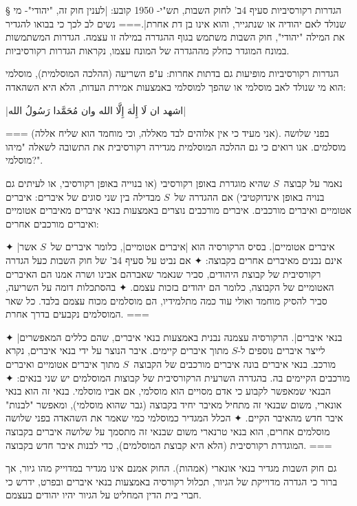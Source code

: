 § הגדרות רקורסיביות
סעיף 4ב' לחוק השבות, תש"י- 1950 קובע:
\ע|לענין חוק זה, "יהודי"- מי שנולד לאם יהודיה או שנתגייר, והוא אינו בן
דת אחרת|.===
נשים לב לכך כי בבואו להגדיר את המילה "יהודי", חוק השבות משתמש בגוף ההגדרה במילה
זו עצמה. הגדרות המשתמשות במונח המוגדר כחלק מההגדרה של המונח עצמו, נקראות הגדרות
רקורסיביות.

הגדרות רקורסיביות מופיעות גם בדתות אחרות: ע"פ השריעה (ההלכה המוסלמית), מוסלמי
הוא מי שנולד לאב מוסלמי או שהפך למוסלמי באמצעות אמירת העדות, הלא היא השהאדה:
\begin{Arabic}
  \ע|اشهد ان لَا إِلٰهَ إِلَّا الله وان مُحَمَّدا رَسُولُ الله|
\end{Arabic}
===
(אני מעיד כי אין אלוהים לבד מאללה, וכי מוחמד הוא שליח אללה). בפני שלושה
מוסלמים. אנו רואים כי גם ההלכה המוסלמית מגדירה רקורסיבית את התשובה לשאלה "מיהו
מוסלמי?".

נאמר על קבוצה~$S$ שהיא מוגדרת באופן רקורסיבי (או בנוייה באופן רקורסיבי, או
לעיתים גם בנויה באופן אינדוקטיבי) אם ההגדרה של~$S$ מבדילה בין שני סוגים של
איברים: איברים אטומיים ואיברים מורכבים.
איברים מורכבים נוצרים באמצעות בנאי איברים מאיברים אטומיים ואיברים מורכבים
אחרים:
\begin{itemize}
  ✦ \ע|איברים אטומיים|. בסיס הרקורסיה הוא \ע|איברים אטומיים|, כלומר איברים
  של~$S$ אשר אינם נבנים מאיברים אחרים בקבוצה:
  ✦ אם נביט על סעיף 4ב' של חוק השבות כעל הגדרה רקורסיבית של קבוצת היהודים, סביר
  שנאמר שאברהם אבינו ושרה
  אמנו הם האיברים האטומיים של הקבוצה, כלומר הם יהודים בזכות עצמם.
  ✦ בהסתכלות דומה על השריעה, סביר להסיק מוחמד ואולי עוד כמה מתלמידיו, הם מוסלמים
  מכוח עצמם בלבד. כל שאר המוסלמים נקבעים בדרך אחרת.
===

  ✦ \ע|בנאי איברים|. הרקורסיה עצמנה נבנית באמצעות בנאי איברים, שהם כללים
  המאפשרים לייצר איברים נוספים ל-$S$ מתוך איברים קיימים. איבר הנוצר על ידי בנאי
  איברים, נקרא מורכב. בנאי איברים בונה איברים מורכבים של הקבוצה~$S$ מתוך איברים
  אטומיים ואיברים מורכבים הקיימים בה. בהגדרה השרעית הרקורסיבית של קבוצות
  המוסלמים יש שני בנאים:
  ✦ הבנאי שמאפשר לקבוע כי אדם מסויים הוא מוסלמי, אם אביו מוסלמי. בנאי זה הוא בנאי
  אונארי, משום שבנאי זה מתחיל מאיבר יחיד בקבוצה (גבר שהוא מוסלמי), ומאפשר
  "לבנות" איבר חדש מהאיבר הקיים.
  ✦ הכלל המגדיר כמוסלמי כמי שאמר את השהאדה בפני שלושה מוסלמים אחרים, הוא בנאי
  טרנארי משום שבנאי זה מתסמך על שלושה איברים בקבוצה המוגדרת רקורסיבית (הלא היא
  קבוצת המוסלמים), כדי לבנות איבר חדש בקבוצה.
===

  גם חוק השבות מגדיר בנאי אונארי (אמהות). החוק אמנם אינו מגדיר
  במדוייק מהו גיור, אך ברור כי הגדרה מדוייקת של הגיור, תכלול רקורסיה באמצעות בנאי
  איברים ובפרט, ידרש כי חברי בית הדין המחליט על הגיור יהיו יהודים בעצמם.
\end{itemize}

